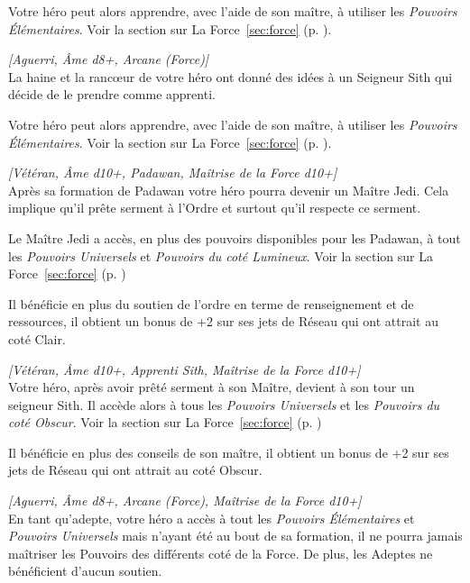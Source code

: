 \begin{description}[align=left]
        Votre héro peut alors apprendre, avec l’aide de son maître, à utiliser les \emph{Pouvoirs \'Elémentaires}. Voir la section sur La Force~\ref{sec:force} (p. \pageref{sec:force}).

    \item [Apprenti Sith]
        \emph{[Aguerri, \^Ame d8+, Arcane (Force)]}\\
        La haine et la ranc\oe{ur} de votre héro ont donné des idées à un Seigneur Sith qui décide de le prendre comme apprenti.

        Votre héro peut alors apprendre, avec l’aide de son maître, à utiliser les \emph{Pouvoirs \'Elémentaires}. Voir la section sur La Force~\ref{sec:force} (p. \pageref{sec:force}).

    \item [Maître Jedi]
        \emph{[Vétéran, \^Ame d10+, Padawan, Maîtrise de la Force d10+]}\\
        Après sa formation de Padawan votre héro pourra devenir un Maître Jedi. Cela implique qu’il prête serment à l’Ordre et surtout qu’il respecte ce serment.

        Le Maître Jedi a accès, en plus des pouvoirs disponibles pour les Padawan, à tout les \emph{Pouvoirs Universels} et \emph{Pouvoirs du coté Lumineux}. Voir la section sur La Force~\ref{sec:force} (p. \pageref{sec:force})

        Il bénéficie en plus du soutien de l’ordre en terme de renseignement et de ressources, il obtient un bonus de +2 sur ses jets de Réseau qui ont attrait au coté Clair.

    \item [Seigneur Sith]
        \emph{[Vétéran, \^Ame d10+, Apprenti Sith, Maîtrise de la Force d10+]}\\
        Votre héro, après avoir prêté serment à son Maître, devient à son tour un seigneur Sith. Il accède alors à tous les \emph{Pouvoirs Universels} et les \emph{Pouvoirs du coté Obscur}. Voir la section sur La Force~\ref{sec:force} (p. \pageref{sec:force})

        Il bénéficie en plus des conseils de son maître, il obtient un bonus de +2 sur ses jets de Réseau qui ont attrait au coté Obscur.

    \item [Adepte Sauvage]
        \emph{[Aguerri, \^Ame d8+, Arcane (Force), Maîtrise de la Force d10+]}\\
        En tant qu’adepte, votre héro a accès à tout les \emph{Pouvoirs \'Elémentaires} et \emph{Pouvoirs Universels} mais n’ayant été au bout de sa formation, il ne pourra jamais maîtriser les Pouvoirs des différents coté de la Force. De plus, les Adeptes ne bénéficient d’aucun soutien.


\end{description}
